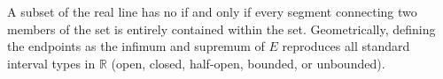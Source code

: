 \begin{content}
\begin{center}
\end{center}

\begin{steps}
A subset of the real line has no  if and only if every segment connecting two members of the set is entirely contained within the set. Geometrically, defining the endpoints as the infimum and supremum of $E$ reproduces all standard interval types in $\mathbb{R}$ (open, closed, half-open, bounded, or unbounded).
\end{steps}
\end{content}

\begin{hidden}
\end{hidden}

